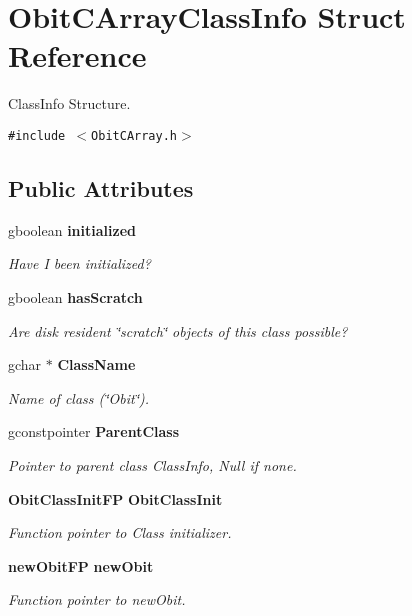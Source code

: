 \section{Obit\-CArray\-Class\-Info Struct Reference}
\label{structObitCArrayClassInfo}
Class\-Info Structure.  


{\tt \#include $<$Obit\-CArray.h$>$}

\subsection*{Public Attributes}
\begin{CompactItemize}
\item 
gboolean {\bf initialized}
\begin{CompactList}\small\item\em Have I been initialized? \item\end{CompactList}\item 
gboolean {\bf has\-Scratch}
\begin{CompactList}\small\item\em Are disk resident \char`\"{}scratch\char`\"{} objects of this class possible? \item\end{CompactList}\item 
gchar $\ast$ {\bf Class\-Name}
\begin{CompactList}\small\item\em Name of class (\char`\"{}Obit\char`\"{}). \item\end{CompactList}\item 
gconstpointer {\bf Parent\-Class}
\begin{CompactList}\small\item\em Pointer to parent class Class\-Info, Null if none. \item\end{CompactList}\item 
{\bf Obit\-Class\-Init\-FP} {\bf Obit\-Class\-Init}
\begin{CompactList}\small\item\em Function pointer to Class initializer. \item\end{CompactList}\item 
{\bf new\-Obit\-FP} {\bf new\-Obit}
\begin{CompactList}\small\item\em Function pointer to new\-Obit. \item\end{CompactList}\item 

\end{CompactItemize}
